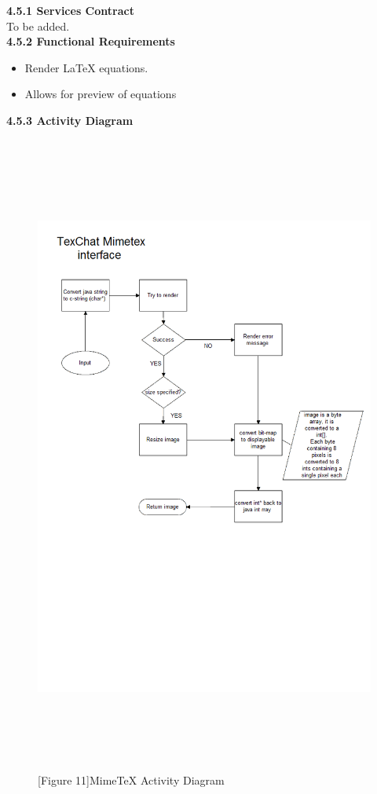 \documentclass[29pt,a4paper]{moderncv}
\begin{document}
		\noindent\textbf{4.5.1 Services Contract}\\ 
		To be added.\\
		\textbf{4.5.2 Functional Requirements}
			\begin{itemize}
				\item Render LaTeX equations.\\
				\item Allows for preview of equations\\
			\end{itemize}
\newpage
		\left\textbf{4.5.3 Activity Diagram}
		\begin{figure}
			\centering
			\\ \includegraphics[width=6.0in, height=8.0in]{./activityMimeTex.png}
			\\\caption{[Figure 11]MimeTeX Activity Diagram}
		\end{figure}
\newpage
\end{document}
